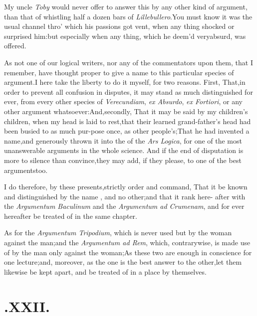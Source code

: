 \documentclass{article}
\begin{document}
My uncle \textit{Toby} would never offer to answer this by any
other kind of argument, than that of whistling half a dozen bars of
\textit{Lillebullero}.\tsh  You must know it was the usual
channel thro’ which his passions got vent, when any thing
shock\-ed or surprised him:\tsh  but especially when any
thing, which he deem’d very\break absurd, was offered.

As not one of our logical writers, nor any of the commentators
upon them, that I remember, have thought proper to give a name
to this particular species of argument.\tsk  I here take the
liberty to do it myself, for two reasons. First, That,\break in order to
prevent all confusion in disputes, it may stand as much
distinguish\-ed for ever, from every other species of
\textit{Verecundiam},
\textit{ex Absurdo}, 
\textit{ex Fortiori}, or any other argument
whatsoever:\tsh  And,\break secondly, That it may be said by my
children’s children, when my head is laid to
rest,\tsh  that their learned grand-father’s
head had been busied to as much pur-\break pose once, as other
people’s;\tsk  That he had invented a name,\tsk and generously
thrown it into the  of the \textit{Ars
Logica}, for one of the most unanswerable arguments in the whole
science. And if the end of disputation is more to silence than
convince,\tsk  they may add, if they please, to one of the best
arguments\break too.

I do therefore, by these presents,\break strictly order and command,
That it be known and distinguished by the name
, and no other;\tsk  and that it rank here-\break
after with the
\textit{Argumentum Baculinum} and the \textit{Argumentum ad Crumenam},
and for ever hereafter be treated of in the same chapter.\\

As for the \textit{Argumentum Tripodium}, which is never used but
by the woman against the man;\tsk  and the \textit{Argumentum ad
Rem}, which, contrarywise, is made use of by the man only
against the woman;\tsk  As these two are enough in conscience for
one lecture;\tsh  and, moreover, as the one is the best
answer to the other,\tsk  let them likewise be kept apart, and be
treated of in a place by themselves.

\section{.\enspace XXII.}
\end{document}

